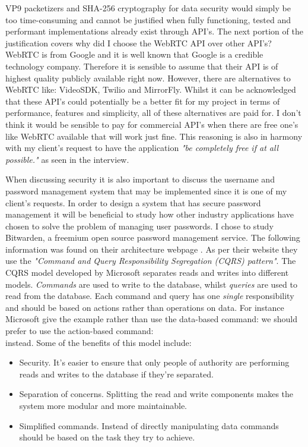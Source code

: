 VP9 packetizers \cite{vp9} and SHA-256 cryptography for data
security would simply be too time-consuming and cannot be
justified when fully functioning, tested and performant 
implementations already exist through API's. The next 
portion of the justification covers why did I choose the
WebRTC API over other API's? WebRTC is from Google and it is 
well known that Google is a credible technology company. 
Therefore it is sensible to assume that their API is of 
highest quality publicly available right now. However, there
are alternatives to WebRTC like: VideoSDK, Twilio and 
MirrorFly. Whilst it can be acknowledged that these API's could
potentially be a better fit for my project in terms of
performance, features and simplicity, all of these alternatives
are paid for. I don't think it would be sensible to pay for
commercial API's when there are free one's like WebRTC
available that will work just fine. This reasoning is also in 
harmony with my client's request to have the application
\textit{"be completely free if at all possible."} as seen in 
the interview. \\ \vspace{0.2cm}

When discussing security it is also important to discuss the 
username and password management system that may be implemented
since it is one of my client's requests. In order to design a 
system that has secure password management it will be 
beneficial to study how other industry applications have chosen
to solve the problem of managing user passwords. I chose to 
study Bitwarden, a freemium open source password management 
service. The following information was found on their 
architecture webpage \cite{Bitwarden}. As per their website 
they use the \textit{"Command and Query Responsibility 
Segregation (CQRS) pattern"}. The CQRS model developed by 
Microsoft separates reads and writes into different models. 
\textit{Commands} are used to write to the database, whilst 
\textit{queries} are used to read from the database. Each 
command and query has one \emph{single} responsibility and 
should be based on actions rather than operations on data. For
instance Microsoft give the example rather than use the
data-based command: 
we should prefer to use the action-based command: \\
 instead. Some of the benefits of 
this model include: 

\begin{itemize}
  \item Security. It's easier to ensure that only people of authority are performing reads and writes to the database if 
they're separated.

  \item Separation of concerns. Splitting the read and write components makes the system more modular and more maintainable. 

  \item Simplified commands. Instead of directly manipulating data commands should be based on the task they try to 
achieve.
\end{itemize}

